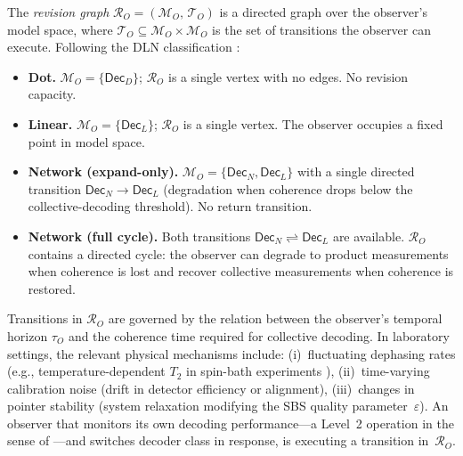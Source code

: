 \begin{definition}
\label{def:revision-qd}
The \emph{revision graph}
$\mathcal{R}_O = (\mathcal{M}_O,\,\mathcal{T}_O)$
is a directed graph over the observer's model space, where
$\mathcal{T}_O \subseteq \mathcal{M}_O\times\mathcal{M}_O$ is the set
of transitions the observer can execute.
Following the DLN classification
\citep[Sec.~2.3]{WuDLNCompression2026preprint}:
%
\begin{itemize}
\item \textbf{Dot.}
  $\mathcal{M}_O=\{\mathsf{Dec}_D\}$;
  $\mathcal{R}_O$ is a single vertex with no edges.
  No revision capacity.

\item \textbf{Linear.}
  $\mathcal{M}_O=\{\mathsf{Dec}_L\}$;
  $\mathcal{R}_O$ is a single vertex.
  The observer occupies a fixed point in model space.

\item \textbf{Network (expand-only).}
  $\mathcal{M}_O=\{\mathsf{Dec}_N,\mathsf{Dec}_L\}$ with a single
  directed transition
  $\mathsf{Dec}_N\to\mathsf{Dec}_L$
  (degradation when coherence drops below the collective-decoding
  threshold).
  No return transition.

\item \textbf{Network (full cycle).}
  Both transitions
  $\mathsf{Dec}_N \rightleftharpoons \mathsf{Dec}_L$
  are available.
  $\mathcal{R}_O$ contains a directed cycle: the observer can degrade to
  product measurements when coherence is lost and recover collective
  measurements when coherence is restored.
\end{itemize}
\end{definition}


\begin{remark}
\label{rem:transition-physics}
Transitions in $\mathcal{R}_O$ are governed by the relation between the
observer's temporal horizon $\tau_O$ and the coherence time required for
collective decoding.
In laboratory settings, the relevant physical mechanisms include:
(i)~fluctuating dephasing rates (e.g., temperature-dependent $T_2$ in
spin-bath experiments \citep{Schlosshauer2007}),
(ii)~time-varying calibration noise (drift in detector efficiency or
alignment),
(iii)~changes in pointer stability (system relaxation modifying the SBS
quality parameter~$\varepsilon$).
An observer that monitors its own decoding performance---a Level~2
operation in the sense of
\citep[Sec.~2.3]{WuDLNCompression2026preprint}---and switches decoder
class in response, is executing a transition in~$\mathcal{R}_O$.
\end{remark}


